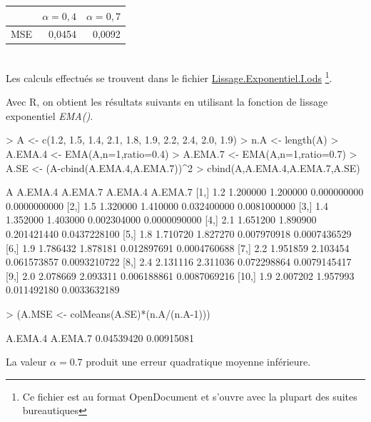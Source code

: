 \begin{solution}{1.4}
\begin{tabular}{|l|l|l|}
\hline
& $\alpha=0,4$ & $\alpha=0,7$ \\ \hline
MSE & \multicolumn{1}{r|}{0,0454} & \multicolumn{1}{r|}{0,0092} \\ \hline
\end{tabular} \\

Les calculs effectués se trouvent dans le fichier \url{Lissage.Exponentiel.I.ods} \footnote{Ce fichier est au format OpenDocument et s'ouvre avec la plupart des suites bureautiques}.

Avec R, on obtient les résultats suivants en utilisant la fonction de lissage exponentiel \emph{EMA()}.

\begin{Schunk}
\begin{Sinput}
> A <- c(1.2, 1.5, 1.4, 2.1, 1.8, 1.9, 2.2, 2.4, 2.0, 1.9)
> n.A <- length(A)
> A.EMA.4 <- EMA(A,n=1,ratio=0.4)
> A.EMA.7 <- EMA(A,n=1,ratio=0.7)
> A.SE <- (A-cbind(A.EMA.4,A.EMA.7))^2
> cbind(A,A.EMA.4,A.EMA.7,A.SE)
\end{Sinput}
\begin{Soutput}
        A  A.EMA.4  A.EMA.7     A.EMA.4      A.EMA.7
 [1,] 1.2 1.200000 1.200000 0.000000000 0.0000000000
 [2,] 1.5 1.320000 1.410000 0.032400000 0.0081000000
 [3,] 1.4 1.352000 1.403000 0.002304000 0.0000090000
 [4,] 2.1 1.651200 1.890900 0.201421440 0.0437228100
 [5,] 1.8 1.710720 1.827270 0.007970918 0.0007436529
 [6,] 1.9 1.786432 1.878181 0.012897691 0.0004760688
 [7,] 2.2 1.951859 2.103454 0.061573857 0.0093210722
 [8,] 2.4 2.131116 2.311036 0.072298864 0.0079145417
 [9,] 2.0 2.078669 2.093311 0.006188861 0.0087069216
[10,] 1.9 2.007202 1.957993 0.011492180 0.0033632189
\end{Soutput}
\begin{Sinput}
> (A.MSE <- colMeans(A.SE)*(n.A/(n.A-1)))
\end{Sinput}
\begin{Soutput}
   A.EMA.4    A.EMA.7
0.04539420 0.00915081
\end{Soutput}
\end{Schunk}

La valeur $\alpha=0.7$ produit une erreur quadratique moyenne inférieure.
\end{solution}
